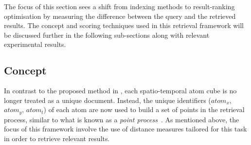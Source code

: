 The focus of this section sees a shift from indexing methods to result-ranking optimisation by measuring the difference between the query and the retrieved
results. The concept and scoring techniques used in this retrieval framework will be discussed further in the following sub-sections along with relevant experimental results.

\vspace{1em}
\subsection{Concept}

In contrast to the proposed method in \versionOneRet, each spatio-temporal atom cube is no longer treated as a unique document. Instead, the unique identifiers ($atom_x$, $atom_y$, $atom_t$) of each atom are now used to build a set of points in the retrieval process, similar to what is known as a \emph{point process}~\cite{diggle2013statistical}. As mentioned above, the focus of this
framework involve the use of distance measures 
tailored for this task in order to retrieve
relevant results.

